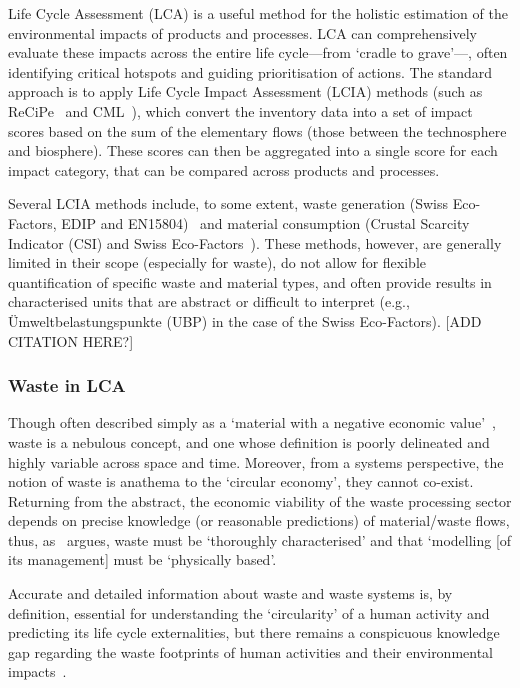 Life Cycle Assessment (LCA) is a useful method for the holistic estimation of the environmental impacts of products and processes. LCA can comprehensively evaluate these impacts across the entire life cycle---from `cradle to grave'---, often identifying critical hotspots and guiding prioritisation of actions. The standard approach is to apply Life Cycle Impact Assessment (LCIA) methods (such as ReCiPe~\citep{huijbregts2016recipe} and CML~\citep{guinee2002cml}), which convert the inventory data into a set of impact scores based on the sum of the elementary flows (those between the technosphere and biosphere). These scores can then be aggregated into a single score for each impact category, that can be compared across products and processes.

Several LCIA methods include, to some extent, waste generation (Swiss Eco-Factors, EDIP and EN15804)~\citep{foen2021ecofactors,hauschild2003edip,cen2019en15804} and material consumption (Crustal Scarcity Indicator (CSI) and Swiss Eco-Factors~\citep{arvidsson2020csi,foen2021ecofactors}). These methods, however, are generally limited in their scope (especially for waste), do not allow for flexible quantification of specific waste and material types, and often provide results in characterised units that are abstract or difficult to interpret (e.g., Ümweltbelastungspunkte (UBP) in the case of the Swiss Eco-Factors). [ADD CITATION HERE?]


\subsubsection{Waste in LCA}

Though often described simply as a `material with a negative economic value'~\citep{guinee2004economicallocation}, waste is a nebulous concept, and one whose definition is poorly delineated and highly variable across space and time.  Moreover, from a systems perspective, the notion of waste is anathema to the `circular economy', they cannot co-exist. Returning from the abstract, the economic viability of the waste processing sector depends on precise knowledge (or reasonable predictions) of material/waste flows, thus, as~\cite{bisinella2024wastelca} argues, waste must be `thoroughly characterised' and that `modelling [of its management] must be `physically based'. 

Accurate and detailed information about waste and waste systems is, by definition, essential for understanding the `circularity' of a human activity and predicting its life cycle externalities, but there remains a conspicuous knowledge gap regarding the waste footprints of human activities and their environmental impacts~\citep{laurenti2023wastefootprint}. 


